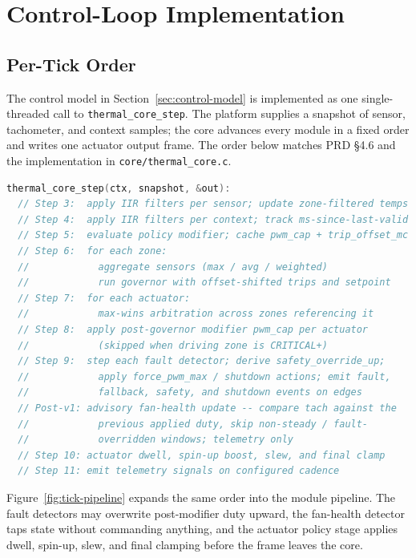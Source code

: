 \section{Control-Loop Implementation}

\subsection{Per-Tick Order}

The control model in Section~\ref{sec:control-model} is implemented as one single-threaded call to \texttt{thermal\_core\_step}. The platform supplies a snapshot of sensor, tachometer, and context samples; the core advances every module in a fixed order and writes one actuator output frame. The order below matches PRD §4.6 and the implementation in \texttt{core/thermal\_core.c}.

\begin{lstlisting}[language=C,caption={Per-tick control-loop order in \texttt{thermal\_core\_step}}]
thermal_core_step(ctx, snapshot, &out):
  // Step 3:  apply IIR filters per sensor; update zone-filtered temps
  // Step 4:  apply IIR filters per context; track ms-since-last-valid
  // Step 5:  evaluate policy modifier; cache pwm_cap + trip_offset_mc
  // Step 6:  for each zone:
  //            aggregate sensors (max / avg / weighted)
  //            run governor with offset-shifted trips and setpoint
  // Step 7:  for each actuator:
  //            max-wins arbitration across zones referencing it
  // Step 8:  apply post-governor modifier pwm_cap per actuator
  //            (skipped when driving zone is CRITICAL+)
  // Step 9:  step each fault detector; derive safety_override_up;
  //            apply force_pwm_max / shutdown actions; emit fault,
  //            fallback, safety, and shutdown events on edges
  // Post-v1: advisory fan-health update -- compare tach against the
  //            previous applied duty, skip non-steady / fault-
  //            overridden windows; telemetry only
  // Step 10: actuator dwell, spin-up boost, slew, and final clamp
  // Step 11: emit telemetry signals on configured cadence
\end{lstlisting}

Figure~\ref{fig:tick-pipeline} expands the same order into the module pipeline. The fault detectors may overwrite post-modifier duty upward, the fan-health detector taps state without commanding anything, and the actuator policy stage applies dwell, spin-up, slew, and final clamping before the frame leaves the core.

